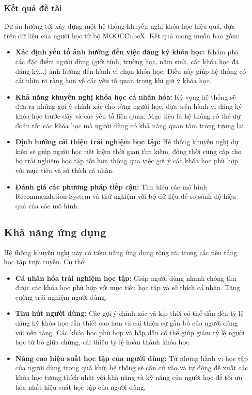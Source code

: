 \subsubsection{Kết quả đề tài}
Dự án hướng tới xây dựng một hệ thống khuyến nghị khóa học hiệu quả, dựa trên dữ liệu của người học từ bộ MOOCCubeX. Kết quả mong muốn bao gồm:
\begin{itemize}
    \item \textbf{Xác định yếu tố ảnh hưởng đến việc đăng ký khóa học:} Khám phá các đặc điểm người dùng (giới tính, trường học, năm sinh, các khóa học đã đăng ký...) ảnh hưởng đến hành vi chọn khóa học. Điều này giúp hệ thống có cái nhìn rõ ràng hơn về các yếu tố quan trọng khi gợi ý khóa học.
    \item \textbf{Khả năng khuyến nghị khóa học cá nhân hóa:} Kỳ vọng hệ thống sẽ đưa ra những gợi ý chính xác cho từng người học, dựa trên hành vi đăng ký khóa học trước đây và các yếu tố liên quan. Mục tiêu là hệ thống có thể dự đoán tốt các khóa học mà người dùng có khả năng quan tâm trong tương lai.
    \item \textbf{Định hướng cải thiện trải nghiệm học tập:} Hệ thống khuyến nghị dự kiến sẽ giúp người học tiết kiệm thời gian tìm kiếm, đồng thời cung cấp cho họ trải nghiệm học tập tốt hơn thông qua việc gợi ý các khóa học phù hợp với mục tiêu và sở thích cá nhân.
    \item \textbf{Đánh giá các phương pháp tiếp cận:} Tìm hiểu các mô hình Recommendation System và thử nghiệm với bộ dữ liệu để so sánh độ hiệu quả của các mô hình.
\end{itemize}
\subsection{Khả năng ứng dụng}
Hệ thống khuyến nghị này có tiềm năng ứng dụng rộng rãi trong các nền tảng học tập trực tuyến. Cụ thể:
\begin{itemize}
    \item \textbf{Cá nhân hóa trải nghiệm học tập:} Giúp người dùng nhanh chóng tìm được các khóa học phù hợp với mục tiêu học tập và sở thích cá nhân. Tăng cường trải nghiệm người dùng.
    \item \textbf{Thu hút người dùng:} Các gợi ý chính xác và kịp thời có thể dẫn đến tỷ lệ đăng ký khóa học cần thiết cao hơn và cải thiện sự gắn bó của người dùng với nền tảng. Các khóa học phù hợp và hấp dẫn có thể giúp giảm tỷ lệ người học từ bỏ giữa chừng, cải thiện tỷ lệ hoàn thành khóa học.
    \item \textbf{Nâng cao hiệu suất học tập của người dùng:} Từ những hành vi học tập của người dùng trong quá khứ, hệ thống sẽ căn cứ vào và tự động đề xuất các khóa học tương thích nhất với khả năng và kỹ năng của người học để tối ưu hóa nhất hiệu suất học tập của người dùng.
\end{itemize}


